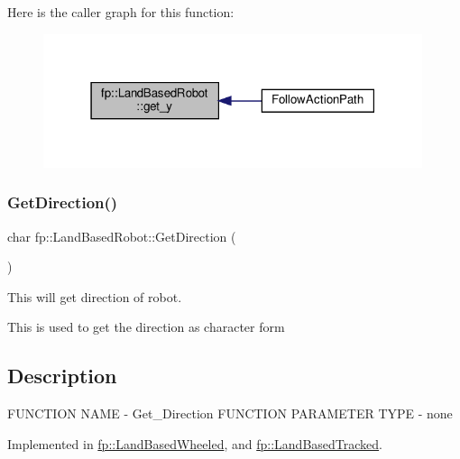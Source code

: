 Here is the caller graph for this function\+:
\nopagebreak
\begin{figure}[H]
\begin{center}
\leavevmode
\includegraphics[width=315pt]{classfp_1_1_land_based_robot_ae742797bee07ac5b92bfe934cbfed6e9_icgraph}
\end{center}
\end{figure}
\mbox{\label{classfp_1_1_land_based_robot_a50841b6e40d4e92832770d26b427fea2}} 
\subsubsection{\texorpdfstring{Get\+Direction()}{GetDirection()}}
{\footnotesize\ttfamily char fp\+::\+Land\+Based\+Robot\+::\+Get\+Direction (\begin{DoxyParamCaption}{ }\end{DoxyParamCaption})\hspace{0.3cm}{\ttfamily [pure virtual]}}



This will get direction of robot. 

This is used to get the direction as character form\hypertarget{main_8cpp_Description}{}\subsection{Description}\label{main_8cpp_Description}
F\+U\+N\+C\+T\+I\+ON N\+A\+ME -\/ Get\+\_\+\+Direction F\+U\+N\+C\+T\+I\+ON P\+A\+R\+A\+M\+E\+T\+ER T\+Y\+PE -\/ none 

Implemented in \hyperlink{classfp_1_1_land_based_wheeled_a87c986392b37f25dd63e03866c2ab9c2}{fp\+::\+Land\+Based\+Wheeled}, and \hyperlink{classfp_1_1_land_based_tracked_acb4201d9ba3660fbdb52bc95cddaa5bf}{fp\+::\+Land\+Based\+Tracked}.

\mbox{\label{classfp_1_1_land_based_robot_a5df828c5d6c1f7fb4c7b68f53d9c6080}} 
